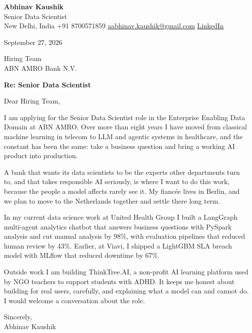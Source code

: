 \documentclass[11pt,a4paper]{article}
\begin{document}
{\Large\bfseries Abhinav Kaushik}\\
Senior Data Scientist\\
New Delhi, India \textbar{} +91 8700571859 \textbar{} \href{mailto:aabhinav.kaushik@gmail.com}{aabhinav.kaushik@gmail.com} \textbar{} \href{https://www.linkedin.com/in/abhinav-kaushik10/}{LinkedIn}  

September 27, 2026

Hiring Team\\
ABN AMRO Bank N.V.

\textbf{Re: Senior Data Scientist}

Dear Hiring Team,

I am applying for the Senior Data Scientist role in the Enterprise Enabling Data Domain at ABN AMRO. Over more than eight years I have moved from classical machine learning in telecom to LLM and agentic systems in healthcare, and the constant has been the same: take a business question and bring a working AI product into production.

A bank that wants its data scientists to be the experts other departments turn to, and that takes responsible AI seriously, is where I want to do this work, because the people a model affects rarely see it. My fiancée lives in Berlin, and we plan to move to the Netherlands together and settle there long term.

In my current data science work at United Health Group I built a LangGraph multi-agent analytics chatbot that answers business questions with PySpark analysis and cut manual analysis by 98\%, with evaluation pipelines that reduced human review by 43\%. Earlier, at Viavi, I shipped a LightGBM SLA breach model with MLflow that reduced downtime by 67\%.

Outside work I am building ThinkTree.AI, a non-profit AI learning platform used by NGO teachers to support students with ADHD. It keeps me honest about building for real users, carefully, and explaining what a model can and cannot do. I would welcome a conversation about the role.

Sincerely,\\[4pt]
Abhinav Kaushik
\end{document}
